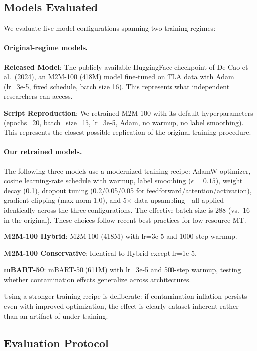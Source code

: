 \documentclass[11pt,a4paper]{article}
\begin{document}
\subsection{Models Evaluated}
\label{sec:method-models}

We evaluate five model configurations spanning two training regimes:

\paragraph{Original-regime models.}

\textbf{Released Model}: The publicly available HuggingFace checkpoint of De Cao et al.\ (2024), an M2M-100 (418M) model fine-tuned on TLA data with Adam (lr=3e-5, fixed schedule, batch size 16). This represents what independent researchers can access.

\textbf{Script Reproduction}: We retrained M2M-100 with its default hyperparameters (epochs=20, batch\_size=16, lr=3e-5, Adam, no warmup, no label smoothing). This represents the closest possible replication of the original training procedure.

\paragraph{Our retrained models.} The following three models use a modernized training recipe: AdamW optimizer, cosine learning-rate schedule with warmup, label smoothing ($\epsilon{=}0.15$), weight decay (0.1), dropout tuning (0.2/0.05/0.05 for feedforward/attention/activation), gradient clipping (max norm 1.0), and 5$\times$ data upsampling---all applied identically across the three configurations. The effective batch size is 288 (vs.\ 16 in the original). These choices follow recent best practices for low-resource MT.

\textbf{M2M-100 Hybrid}: M2M-100 (418M) with lr=3e-5 and 1000-step warmup.

\textbf{M2M-100 Conservative}: Identical to Hybrid except lr=1e-5.

\textbf{mBART-50}: mBART-50 (611M) with lr=3e-5 and 500-step warmup, testing whether contamination effects generalize across architectures.

Using a stronger training recipe is deliberate: if contamination inflation persists even with improved optimization, the effect is clearly dataset-inherent rather than an artifact of under-training.

\subsection{Evaluation Protocol}
\label{sec:method-eval}
\end{document}
